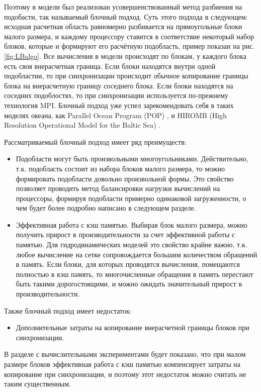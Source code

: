 Поэтому в модели был реализован усовершенствованный метод разбиения на подобасти, так называемый блочный подход.
Суть этого подхода в следующем: исходная расчетная область равномерно разбивается на прямоугольные блоки малого размера,
и каждому процессору ставится в соответствие некоторый набор блоков, которые и формируют его расчётную подобласть, пример показан на рис. \ref{fig:LBalgo}.
Все вычисления в модели происходят по блокам, у каждого блока есть своя внерасчетная граница. Если блоки находятся внутри одной подобластии,
то при синхронизации происходит обычное копирование границы блока на внерасчетную границу соседнего блока. Если блоки находятся на соседних подоблостях,
то при синхронизации используется по-прежнему технология MPI.
Блочный подход уже успел зарекомендовать себя в таких моделях океана, как Parallel Ocean Program (POP) \cite{POP}, \cite{gmd-7-267-2014} и
HIROMB (High Resolution Operational Model for the Baltic Sea) \cite{HIROMB}.


Рассматриваемый блочный подход имеет ряд преимуществ:
\begin{itemize}
    \item Подобласти могут быть произвольными многоугольниками. Действительно, т.к. подобласть состоит из набора блоков малого размера, то можно формировать подобласти довольно произвольной формы. Это свойство позволяет проводить метод балансировки нагрузки вычислений на процессоры, формируя подобласти примерно одинаковой загруженности, о чем будет более подробно написано в следующем разделе.
    \item Эффективная работа с кэш памятью. Выбирая блок малого размера, можно получить прирост в производительности за счет эффективной работы с памятью.
    Для гидродинамических моделей это свойство крайне важно, т.к. любое вычисление на сетке сопровождается большим количеством обращений в память.
    Если блоки, для которых проводятся вычисления, помещаются полностью в кэш память, то  многочисленные обращения в память перестают быть такими дорогостоящими,
    и можно ожидать значительный прирост в производительности.
\end{itemize}

Также блочный подход имеет недостаток:
\begin{itemize}
    \item Дополнительные затраты на копирование внерасчетной границы блоков при синхронизации.
\end{itemize}

В разделе с вычислительными экспериментами будет показано, что при малом размере блоков эффективная работа с кэш памятью компенсирует затраты на копирование при синхронизации, и поэтому этот недостаток можно считать не таким существенным.

